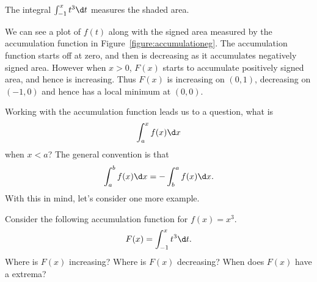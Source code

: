 \begin{marginfigure}
\caption{The integral $\int_{-1}^x t^3 \d t$ measures the shaded area.}
\label{figure:accumulationeg}
\end{marginfigure}

\begin{solution}
We can see a plot of $f(t)$ along with the signed area measured by the
accumulation function in Figure~\ref{figure:accumulationeg}. The
accumulation function starts off at zero, and then is decreasing as it
accumulates negatively signed area. However when $x>0$, $F(x)$ starts
to accumulate positively signed area, and hence is increasing. Thus
$F(x)$ is increasing on $(0,1)$, decreasing on $(-1,0)$ and hence has
a local minimum at $(0,0)$.
\end{solution}

Working with the accumulation function leads us to a question, what is  
\[
\int_a^x f(x) \d x
\]
when $x< a$? The general convention is that 
\[
\int_a^b f(x) \d x = -\int_b^a f(x) \d x. 
\]
With this in mind, let's consider one more example.


\begin{example} 
Consider the following accumulation function for $f(x) = x^3$.
\[
F(x) = \int_{-1}^x t^3 \d t.
\]
Where is $F(x)$ increasing? Where is $F(x)$ decreasing? When does
$F(x)$ have a extrema?
\end{example}

